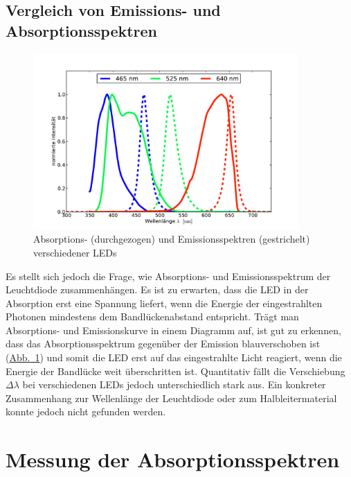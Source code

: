 \documentclass[11pt]{scrartcl}
\newcommand{\hypref}[2]{\hyperref[#2]{{#1}~\ref{#2}}}
\begin{document}
\subsection{Vergleich von Emissions- und Absorptionsspektren}
\begin{figure}[!b]
\begin{center}
\includegraphics[width=0.9\textwidth]{absorp-emit.pdf}
\end{center}
\vspace{-1.5\baselineskip}
\caption{Absorptions- (durchgezogen) und Emissionsspektren (gestrichelt) verschiedener LEDs}
\label{Absorption und Emission von LEDs}
\end{figure}
Es stellt sich jedoch die Frage, wie Absorptions- und Emissionsspektrum der Leuchtdiode zusammenh\"angen.
Es ist zu erwarten, dass die LED in der Absorption erst eine Spannung liefert, wenn die Energie der eingestrahlten Photonen mindestens dem Bandlückenabstand entspricht.
Tr\"agt man Absorptions- und Emissionskurve in einem Diagramm auf, ist gut zu erkennen, dass das Absorptionsspektrum gegen\"uber der Emission blauverschoben ist (\hypref{Abb.}{Absorption und Emission von LEDs}) und somit die LED erst auf das eingestrahlte Licht reagiert, wenn die Energie der Bandlücke weit überschritten ist. Quantitativ fällt die Verschiebung $\Delta \lambda$ bei verschiedenen LEDs jedoch unterschiedlich stark aus.
Ein konkreter Zusammenhang zur Wellenlänge der Leuchtdiode oder zum Halbleitermaterial konnte jedoch nicht gefunden werden.



\FloatBarrier
\section{Messung der Absorptionsspektren}
\end{document}
